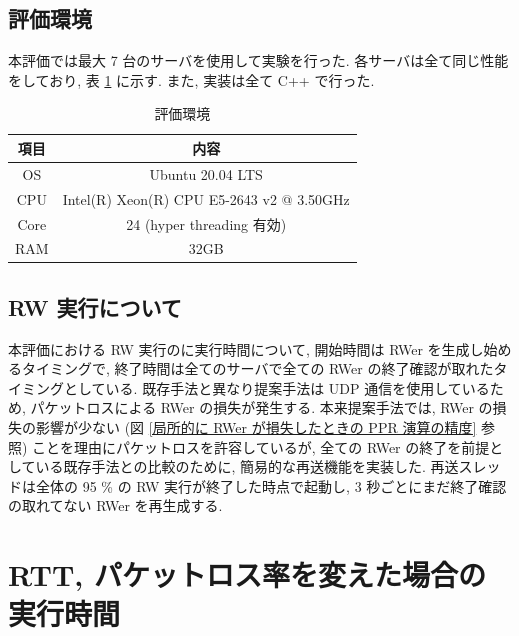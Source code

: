 \subsection{評価環境}

本評価では最大 7 台のサーバを使用して実験を行った. 各サーバは全て同じ性能をしており, 表 \ref{評価環境} に示す. また, 実装は全て C++ で行った. 

\begin{table}[t]
    \caption{評価環境}
    \label{評価環境}
    \centering
    \begin{tabular}{c|c}
      \hline
      項目 & 内容   \\
      \hline \hline
      OS  & Ubuntu 20.04 LTS \\
      CPU  & Intel(R) Xeon(R) CPU E5-2643 v2 @ 3.50GHz  \\
      Core & 24 (hyper threading 有効) \\
      RAM  & 32GB \\
      \hline
    \end{tabular}
\end{table}

\subsection{RW 実行について}

本評価における RW 実行のに実行時間について, 開始時間は RWer を生成し始めるタイミングで, 終了時間は全てのサーバで全ての RWer の終了確認が取れたタイミングとしている. 既存手法と異なり提案手法は UDP 通信を使用しているため, パケットロスによる RWer の損失が発生する. 本来提案手法では, RWer の損失の影響が少ない (図 \ref{局所的に RWer が損失したときの PPR 演算の精度} 参照) ことを理由にパケットロスを許容しているが, 全ての RWer の終了を前提としている既存手法との比較のために, 簡易的な再送機能を実装した. 再送スレッドは全体の 95 \% の RW 実行が終了した時点で起動し, 3 秒ごとにまだ終了確認の取れてない RWer を再生成する.  

\section{RTT, パケットロス率を変えた場合の実行時間}\label{RTT, パケットロス率を変えた場合の実行時間}


